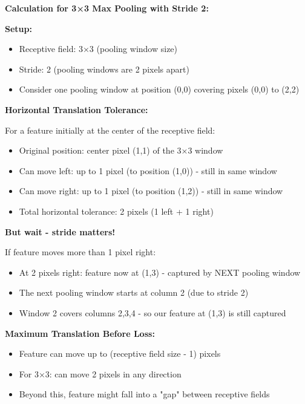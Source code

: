 \documentclass[12pt]{article}
\newcommand{\explanation}[1]{{\color{explanationcolor}#1}}
\begin{document}
\begin{enumerate}[(a)]
{    \textbf{Calculation for 3×3 Max Pooling with Stride 2:}
    
    \explanation{
    \textbf{Setup:}
    \begin{itemize}
        \item Receptive field: 3×3 (pooling window size)
        \item Stride: 2 (pooling windows are 2 pixels apart)
        \item Consider one pooling window at position (0,0) covering pixels (0,0) to (2,2)
    \end{itemize}
    
    \textbf{Horizontal Translation Tolerance:}
    
    For a feature initially at the center of the receptive field:
    \begin{itemize}
        \item Original position: center pixel (1,1) of the 3×3 window
        \item Can move left: up to 1 pixel (to position (1,0)) - still in same window
        \item Can move right: up to 1 pixel (to position (1,2)) - still in same window
        \item Total horizontal tolerance: 2 pixels (1 left + 1 right)
    \end{itemize}
    
    \textbf{But wait - stride matters!}
    
    If feature moves more than 1 pixel right:
    \begin{itemize}
        \item At 2 pixels right: feature now at (1,3) - captured by NEXT pooling window
        \item The next pooling window starts at column 2 (due to stride 2)
        \item Window 2 covers columns 2,3,4 - so our feature at (1,3) is still captured
    \end{itemize}
    
    \textbf{Maximum Translation Before Loss:}
    \begin{itemize}
        \item Feature can move up to (receptive field size - 1) pixels
        \item For 3×3: can move 2 pixels in any direction
        \item Beyond this, feature might fall into a "gap" between receptive fields
    \end{itemize}
    
}}
\end{enumerate}
\end{document}
